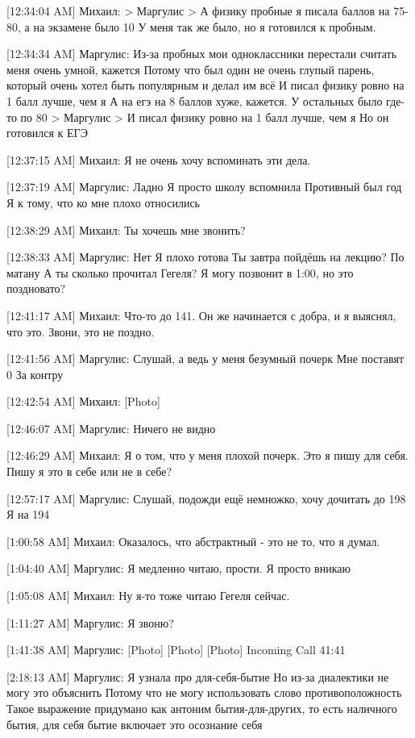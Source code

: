 \documentclass{article}
\begin{document}
{[12:34:04 AM] Михаил:
> Маргулис
> А физику пробные я писала баллов на 75-80, а на экзамене было 10
У меня так же было, но я готовился к пробным.

[12:34:34 AM] Маргулис:
Из-за пробных мои одноклассники перестали считать меня очень умной, кажется
 Потому что был один не очень глупый парень, который очень хотел быть популярным и делал им всё
 И писал физику ровно на 1 балл лучше, чем я
 А на егэ на 8 баллов хуже, кажется. У остальных было где-то по 80
> Маргулис
> И писал физику ровно на 1 балл лучше, чем я
Но он готовился к ЕГЭ

[12:37:15 AM] Михаил:
Я не очень хочу вспоминать эти дела.

[12:37:19 AM] Маргулис:
Ладно
 Я просто школу вспомнила
 Противный был год
 Я к тому, что ко мне плохо относились

[12:38:29 AM] Михаил:
Ты хочешь мне звонить?

[12:38:33 AM] Маргулис:
Нет
 Я плохо готова
 Ты завтра пойдёшь на лекцию?
 По матану
 А ты сколько прочитал Гегеля?
 Я могу позвонит в 1:00, но это поздновато?

[12:41:17 AM] Михаил:
Что-то до 141. Он же начинается с добра, и я выяснял, что это. Звони, это не поздно.

[12:41:56 AM] Маргулис:
Слушай, а ведь у меня безумный почерк
 Мне поставят 0
 За контру

[12:42:54 AM] Михаил:
[Photo]

[12:46:07 AM] Маргулис:
Ничего не видно

[12:46:29 AM] Михаил:
Я о том, что у меня плохой почерк.
 Это я пишу для себя.
 Пишу я это в себе или не в себе?

[12:57:17 AM] Маргулис:
Слушай, подожди ещё немножко, хочу дочитать до 198
 Я на 194

[1:00:58 AM] Михаил:
Оказалось, что абстрактный - это не то, что я думал.

[1:04:40 AM] Маргулис:
Я медленно читаю, прости. Я просто вникаю

[1:05:08 AM] Михаил:
Ну я-то тоже читаю Гегеля сейчас.

[1:11:27 AM] Маргулис:
Я звоню?

[1:41:38 AM] Маргулис:
[Photo]
 [Photo]
 [Photo]
Incoming Call 41:41

[2:18:13 AM] Маргулис:
Я узнала про для-себя-бытие
 Но из-за диалектики не могу это объяснить
 Потому что не могу использовать слово противоположность
 Такое выражение придумано как антоним бытия-для-других, то есть наличного бытия, для себя бытие включает это осознание себя

}
\end{document}
